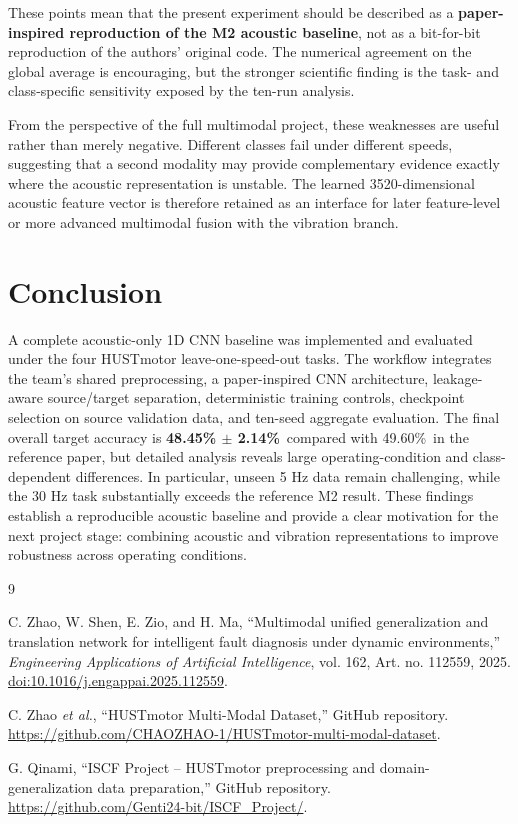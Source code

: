 \documentclass[10pt,a4paper,twocolumn]{article}
\newcommand{\ours}{\textbf{48.45\% $\pm$ 2.14\%}}
\newcommand{\paperavg}{49.60\%}
\begin{document}
These points mean that the present experiment should be described as a \textbf{paper-inspired reproduction of the M2 acoustic baseline}, not as a bit-for-bit reproduction of the authors' original code. The numerical agreement on the global average is encouraging, but the stronger scientific finding is the task- and class-specific sensitivity exposed by the ten-run analysis.

From the perspective of the full multimodal project, these weaknesses are useful rather than merely negative. Different classes fail under different speeds, suggesting that a second modality may provide complementary evidence exactly where the acoustic representation is unstable. The learned 3520-dimensional acoustic feature vector is therefore retained as an interface for later feature-level or more advanced multimodal fusion with the vibration branch.

\section{Conclusion}

A complete acoustic-only 1D CNN baseline was implemented and evaluated under the four HUSTmotor leave-one-speed-out tasks. The workflow integrates the team's shared preprocessing, a paper-inspired CNN architecture, leakage-aware source/target separation, deterministic training controls, checkpoint selection on source validation data, and ten-seed aggregate evaluation. The final overall target accuracy is \ours\ compared with \paperavg\ in the reference paper, but detailed analysis reveals large operating-condition and class-dependent differences. In particular, unseen 5 Hz data remain challenging, while the 30 Hz task substantially exceeds the reference M2 result. These findings establish a reproducible acoustic baseline and provide a clear motivation for the next project stage: combining acoustic and vibration representations to improve robustness across operating conditions.

\FloatBarrier
\balance
\begin{thebibliography}{9}

C. Zhao, W. Shen, E. Zio, and H. Ma,
``Multimodal unified generalization and translation network for intelligent fault diagnosis under dynamic environments,''
\emph{Engineering Applications of Artificial Intelligence}, vol. 162, Art. no. 112559, 2025.
\href{https://doi.org/10.1016/j.engappai.2025.112559}{doi:10.1016/j.engappai.2025.112559}.

C. Zhao \emph{et al.},
``HUSTmotor Multi-Modal Dataset,'' GitHub repository.
\url{https://github.com/CHAOZHAO-1/HUSTmotor-multi-modal-dataset}.

G. Qinami,
``ISCF Project -- HUSTmotor preprocessing and domain-generalization data preparation,'' GitHub repository.
\url{https://github.com/Genti24-bit/ISCF_Project/}.

\end{thebibliography}
\end{document}
